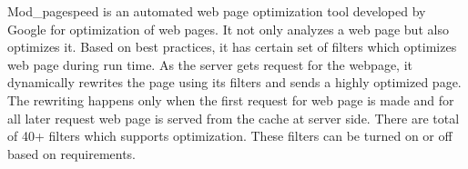 \documentclass[conference]{IEEEtran}
\begin{document}
Mod\_pagespeed is an automated web page optimization tool developed by Google for
optimization of web pages. It not only
analyzes a web page but also optimizes it. Based on best practices, it has
certain set of filters which optimizes web page during run time. As the server
gets request for the webpage, it dynamically rewrites the page using its filters
and sends a highly optimized page. The rewriting happens only when the first
request for web page is made and for all later request web page is served from the cache
at server side. There are total of 40+ filters which supports
optimization. These filters can be turned on or off based on requirements. 
\end{document}
